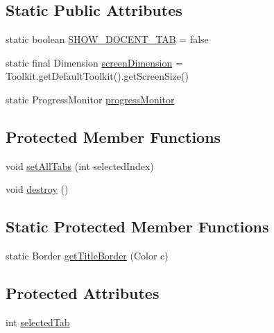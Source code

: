 \subsection*{Static Public Attributes}
\begin{DoxyCompactItemize}
\item 
static boolean \hyperlink{classgov_1_1fnal_1_1ppd_1_1dd_1_1ChannelSelector_ad9e88d31f70467252e90a59943338df0}{S\-H\-O\-W\-\_\-\-D\-O\-C\-E\-N\-T\-\_\-\-T\-A\-B} = false
\item 
static final Dimension \hyperlink{classgov_1_1fnal_1_1ppd_1_1dd_1_1ChannelSelector_a78f6040f260da659faca3b09d0617e7e}{screen\-Dimension} = Toolkit.\-get\-Default\-Toolkit().get\-Screen\-Size()
\item 
static Progress\-Monitor \hyperlink{classgov_1_1fnal_1_1ppd_1_1dd_1_1ChannelSelector_a000b7d7465b66bd829ae995a9494505b}{progress\-Monitor}
\end{DoxyCompactItemize}
\subsection*{Protected Member Functions}
\begin{DoxyCompactItemize}
\item 
void \hyperlink{classgov_1_1fnal_1_1ppd_1_1dd_1_1ChannelSelector_abba1a8a5599959eb2e7a905f6bfd1685}{set\-All\-Tabs} (int selected\-Index)
\item 
void \hyperlink{classgov_1_1fnal_1_1ppd_1_1dd_1_1ChannelSelector_a72b3571d9e3fda6bba926fc732c583b1}{destroy} ()
\end{DoxyCompactItemize}
\subsection*{Static Protected Member Functions}
\begin{DoxyCompactItemize}
\item 
static Border \hyperlink{classgov_1_1fnal_1_1ppd_1_1dd_1_1ChannelSelector_a984845b48df72e93fb62ca3d36701ba4}{get\-Title\-Border} (Color c)
\end{DoxyCompactItemize}
\subsection*{Protected Attributes}
\begin{DoxyCompactItemize}
\item 
int \hyperlink{classgov_1_1fnal_1_1ppd_1_1dd_1_1ChannelSelector_a362da806f034eb1259564c1db7e67ad5}{selected\-Tab}
\end{DoxyCompactItemize}


